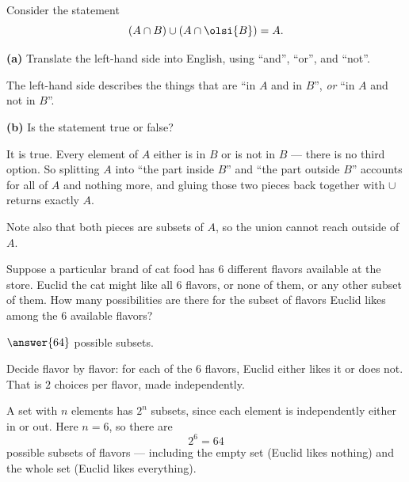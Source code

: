 \documentclass[12pt]{ximera}
\begin{document}
\begin{problem}
Consider the statement
\[ \left(A\cap B\right)\cup\left(A\cap\olsi{B}\right) = A. \]

\begin{prompt}
\textbf{(a)} Translate the left-hand side into English, using ``and'', ``or'', and
``not''.

\begin{freeResponse}
\end{freeResponse}

\begin{feedback}
The left-hand side describes the things that are ``in $A$ and in $B$'', \emph{or}
``in $A$ and not in $B$''.
\end{feedback}
\end{prompt}

\begin{prompt}
\textbf{(b)} Is the statement true or false?

\begin{multipleChoice}
\end{multipleChoice}

\begin{feedback}
It is true. Every element of $A$ either is in $B$ or is not in $B$ --- there is no
third option. So splitting $A$ into ``the part inside $B$'' and ``the part outside
$B$'' accounts for all of $A$ and nothing more, and gluing those two pieces back
together with $\cup$ returns exactly $A$.

Note also that both pieces are subsets of $A$, so the union cannot reach outside of
$A$.
\end{feedback}
\end{prompt}
\end{problem}

\begin{problem}
Suppose a particular brand of cat food has $6$ different flavors available at the
store. Euclid the cat might like all $6$ flavors, or none of them, or any other
subset of them. How many possibilities are there for the subset of flavors Euclid
likes among the $6$ available flavors?

$\answer{64}$ possible subsets.

\begin{hint}
Decide flavor by flavor: for each of the $6$ flavors, Euclid either likes it or does
not. That is $2$ choices per flavor, made independently.
\end{hint}

\begin{feedback}
A set with $n$ elements has $2^n$ subsets, since each element is independently either
in or out. Here $n=6$, so there are
\[ 2^6 = 64 \]
possible subsets of flavors --- including the empty set (Euclid likes nothing) and
the whole set (Euclid likes everything).
\end{feedback}
\end{problem}
\end{document}
